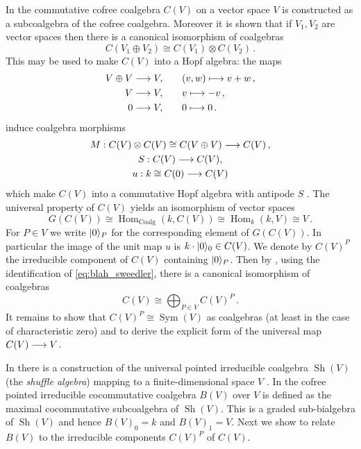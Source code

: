 \documentclass[english,letter paper,12pt,reqno]{article}
\DeclarePairedDelimiter\ket{\lvert}{\rangle}
\theoremstyle{example}
\numberwithin{equation}{section}
\def\sh{\operatorname{Sh}}
\def\Hom{\operatorname{Hom}}
\DeclareMathOperator{\Sym}{Sym}
\begin{document}
In \cite[Theorem 6.4.3]{sweedler} the commutative cofree coalgebra $C(V)$ on a vector space $V$ is constructed as a subcoalgebra of the cofree coalgebra. Moreover it is shown that if $V_1, V_2$ are vector spaces then there is a canonical isomorphism of coalgebras \cite[Theorem 6.4.4]{sweedler}
\[
C(V_1 \oplus V_2) \cong C(V_1) \otimes C(V_2)\,.
\]
This may be used to make $C(V)$ into a Hopf algebra: the maps
\begin{align*}
V \oplus V \longrightarrow V, &\qquad (v,w) \longmapsto v + w\,,\\
V \longrightarrow V, &\qquad v \longmapsto -v\,,\\
0 \longrightarrow V, &\qquad 0 \longmapsto 0\,.
\end{align*}
induce coalgebra morphisms
\begin{gather*}
M: C(V) \otimes C(V) \cong C(V \oplus V) \longrightarrow C(V)\,,\\
S: C(V) \longrightarrow C(V),\\
u: k \cong C(0) \longrightarrow C(V)
\end{gather*}
which make $C(V)$ into a commutative Hopf algebra with antipode $S$ \cite[Theorem 6.4.8]{sweedler}. The universal property of $C(V)$ yields an isomorphism of vector spaces
\begin{equation}\label{eq:blah_sweedler}
G(C(V)) \cong \Hom_{\operatorname{Coalg}}(k, C(V)) \cong \Hom_k(k, V) \cong V\,.
\end{equation}
For $P \in V$ we write $\ket{0}_P$ for the corresponding element of $G(C(V))$. In particular the image of the unit map $u$ is $k \cdot \ket{0}_0 \in C(V)$. We denote by $C(V)^P$ the irreducible component of $C(V)$ containing $\ket{0}_P$. Then by \cite[Proposition 8.1.2]{sweedler}, using the identification of \eqref{eq:blah_sweedler}, there is a canonical isomorphism of coalgebras
\[
C(V) \cong \bigoplus_{P \in V} C(V)^P\,.
\]
It remains to show that $C(V)^P \cong \Sym(V)$ as coalgebras (at least in the case of characteristic zero) and to derive the explicit form of the universal map $C(V) \longrightarrow V$.

In \cite[Chapter 12]{sweedler} there is a construction of the universal pointed irreducible coalgebra $\sh(V)$ (the \emph{shuffle algebra}) mapping to a finite-dimensional space $V$ \cite[Lemma 12.0.1]{sweedler}. In \cite[Section 12.2]{sweedler} the cofree pointed irreducible cocommutative coalgebra $B(V)$ over $V$ is defined as the maximal cocommutative subcoalgebra of $\sh(V)$. This is a graded sub-bialgebra of $\sh(V)$ and hence $B(V)_0 = k$ and $B(V)_1 = V$. Next we show to relate $B(V)$ to the irreducible components $C(V)^P$ of $C(V)$. 
\end{document}
